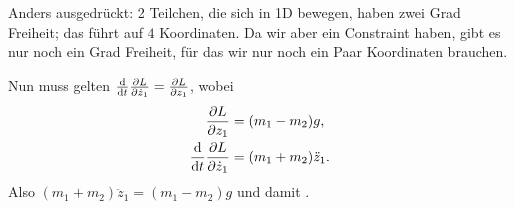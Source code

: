 Anders ausgedrückt: 2 Teilchen, die sich in 1D bewegen, haben zwei Grad Freiheit; das führt auf $4$ Koordinaten. Da wir aber ein Constraint haben, gibt es nur noch ein Grad Freiheit, für das wir nur noch ein Paar Koordinaten brauchen.

Nun muss gelten $\frac{\mathrm{d}}{\mathrm{d}t} \frac{\partial L}{\partial \dot{z}_1} = \frac{\partial L}{\partial z_1}$, wobei
\begin{align*}
	\frac{\partial L}{\partial z_1} &= (m_1 - m_2) g, \\
	\frac{\mathrm{d}}{\mathrm{d}t} \frac{\partial L}{\partial \dot{z}_1} &= (m_1 + m_2) \ddot{z}_1 
	\text{.}
\end{align*}
Also $(m_1 + m_2) \ddot{z}_1 = (m_1 - m_2) g$ und damit .

